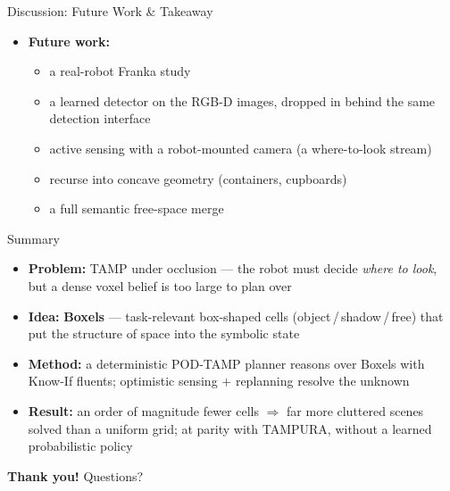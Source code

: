 \documentclass[aspectratio=169, 11pt]{beamer}
\begin{document}
\begin{frame}{Discussion: Future Work \& Takeaway}
  \begin{itemize}[<+->]
    \item \textbf{Future work:}
      \begin{itemize}[<+->]
        \item[\emoji{robot}] a real-robot Franka study
        \item[\emoji{brain}] a learned detector on the RGB-D images, dropped in
              behind the same detection interface
        \item[\emoji{camera}] active sensing with a robot-mounted camera (a
              where-to-look stream)
        \item[\emoji{package}] recurse into concave geometry (containers, cupboards)
        \item[\emoji{puzzle-piece}] a full semantic free-space merge
      \end{itemize}
  \end{itemize}
  \vspace{2mm}
\end{frame}

\begin{frame}{Summary}
  \begin{itemize}
    \item \textbf{Problem:} TAMP under occlusion --- the robot must decide
          \emph{where to look}, but a dense voxel belief is too large to plan over
    \item \textbf{Idea:} \textbf{Boxels} --- task-relevant box-shaped cells
          (object\,/\,shadow\,/\,free) that put the structure of space into the
          symbolic state
    \item \textbf{Method:} a deterministic POD-TAMP planner reasons over Boxels
          with Know-If fluents; optimistic sensing $+$ replanning resolve the
          unknown
    \item \textbf{Result:} an order of magnitude fewer cells $\Rightarrow$ far more
          cluttered scenes solved than a uniform grid; at parity with TAMPURA,
          without a learned probabilistic policy
  \end{itemize}
  \vfill
  \begin{center}
    {\color{i6blue}\Large\bfseries Thank you!}\quad
    {\color{gray}\large Questions?}
  \end{center}
  \vspace{2mm}
\end{frame}
\end{document}

